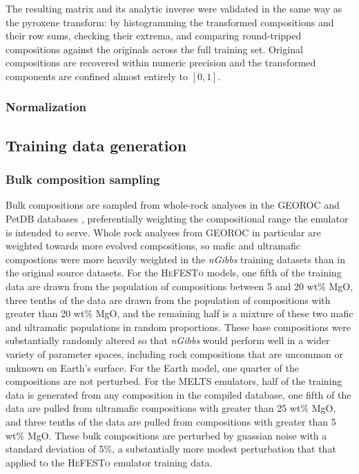 The resulting matrix and its analytic inverse were validated in the same way as the
pyroxene transform: by histogramming the transformed compositions and their row
sums, checking their extrema, and comparing round-tripped compositions against the
originals across the full training set. Original compositions are recovered within numeric precision and the transformed components are confined almost entirely to $[0,1]$.


\subsubsection{Normalization}

\subsection{Training data generation}
\label{sec:datagen}

\subsubsection{Bulk composition sampling}

Bulk compositions are sampled from whole-rock analyses in the GEOROC and PetDB
databases \citep{GEOROC,PetDB}, preferentially weighting the compositional range
the emulator is intended to serve. Whole rock analyses from GEOROC in particular are weighted towards more evolved compositions, so mafic and ultramafic compostions were more heavily weighted in the  \emph{nGibbs} training datasets than in the original source datasets.  For the \textsc{HeFESTo} models, one fifth of the training data are drawn from the population of compositions between 5 and 20 wt\% MgO, three tenths of the data are drawn from the population of compositions with greater than 20 wt\% MgO, and the remaining half is a mixture of these two mafic and ultramafic populations in random proportions. These base compositions were substantially randomly altered so that \emph{nGibbs} would perform well in a wider variety of parameter spaces, including rock compositions that are uncommon or unknown on Earth's surface. For the Earth model, one quarter of the compositions are not perturbed. For the \textsc{MELTS} emulators, half of the training data is generated from any composition in the compiled database, one fifth of the data are pulled from ultramafic compositions with greater than 25 wt\% MgO, and three tenths of the data are pulled from compositions with greater than 5  wt\% MgO. These bulk compositions are perturbed by guassian noise with a standard deviation of 5\%, a substantially more modest perturbation that that applied to the \textsc{HeFESTo} emulator training data.  

